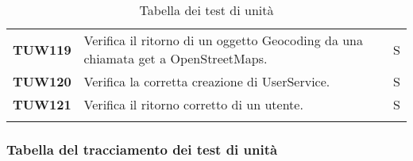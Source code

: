 \documentclass[../../piano-di-qualifica.tex]{subfiles}
\begin{document}
\begin{longtable}[H]{>{\centering\bfseries}m{3cm} >{}m{10cm} >{\centering\arraybackslash}m{3cm}}
  TUW119             & Verifica il ritorno di un oggetto Geocoding da una chiamata get a OpenStreetMaps.                                   & S                             \\


  TUW120             & Verifica la corretta creazione di UserService.                                                                      & S                             \\

  TUW121             & Verifica il ritorno corretto di un utente.                                                                          & S                             \\




  \rowcolor{white}
  \caption{Tabella dei test di unità}%
  \label{tab:test_di_unita}
\end{longtable}


\subsubsection{Tabella del tracciamento dei test di unità}%
\label{subsub:tabella_tracciamento_test_di_unita}
\end{document}
